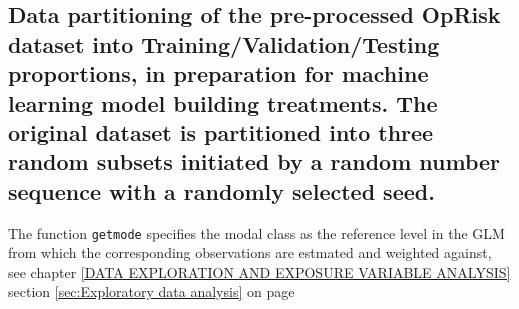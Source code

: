 \documentclass{DissertateUSU}
\begin{document}
\normalsize

\subsection{Data partitioning of the pre-processed OpRisk dataset into Training/Validation/Testing proportions, in preparation for machine learning model building treatments. The original dataset is partitioned into three random subsets initiated by a random number sequence with a randomly selected seed.}
\label{ssec:Data Training/Validation/Testing}

The function \texttt{getmode} specifies the modal class as the reference
level in the GLM from which the corresponding observations are estmated
and weighted against, see chapter
\ref{DATA EXPLORATION AND EXPOSURE VARIABLE ANALYSIS} section
\ref{sec:Exploratory data analysis} on page
\pageref{sec:Exploratory data analysis}

\small
\end{document}
